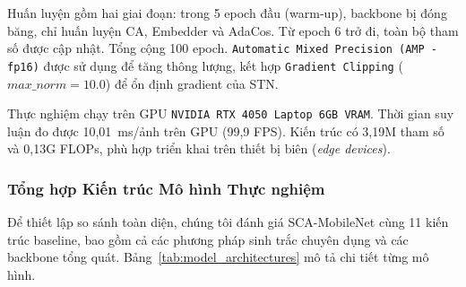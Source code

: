 \documentclass[12pt,a4paper]{article}
\begin{document}
Huấn luyện gồm hai giai đoạn: trong 5 epoch đầu (warm-up), backbone bị đóng băng, chỉ huấn luyện CA, Embedder và AdaCos. Từ epoch 6 trở đi, toàn bộ tham số được cập nhật. Tổng cộng 100 epoch. \texttt{Automatic Mixed Precision (AMP - fp16)} được sử dụng để tăng thông lượng, kết hợp \texttt{Gradient Clipping} ($max\_norm = 10.0$) để ổn định gradient của STN.

Thực nghiệm chạy trên GPU \texttt{NVIDIA RTX 4050 Laptop 6GB VRAM}. Thời gian suy luận đo được 10,01~ms/ảnh trên GPU (99,9 FPS). Kiến trúc có 3,19M tham số và 0,13G FLOPs, phù hợp triển khai trên thiết bị biên (\textit{edge devices}).

\subsubsection{Tổng hợp Kiến trúc Mô hình Thực nghiệm}

Để thiết lập so sánh toàn diện, chúng tôi đánh giá SCA-MobileNet cùng 11 kiến trúc baseline, bao gồm cả các phương pháp sinh trắc chuyên dụng và các backbone tổng quát. Bảng~\ref{tab:model_architectures} mô tả chi tiết từng mô hình.
\end{document}
